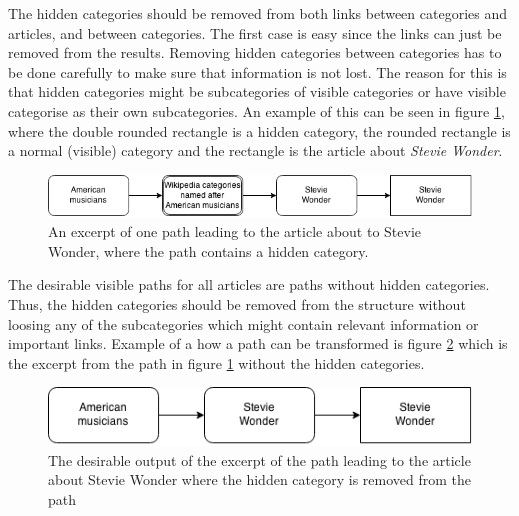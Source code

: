 The hidden categories should be removed from both links between categories and articles, and between categories. The first case is easy since the links can just be removed from the results. Removing hidden categories between categories has to be done carefully to make sure that information is not lost. The reason for this is that hidden categories might be subcategories of visible categories or have visible categorise as their own subcategories. An example of this can be seen in figure \ref{fig:stevie_wonder_hidden}, where the double rounded rectangle is a hidden category, the rounded rectangle is a normal (visible) category and the rectangle is the article about \emph{Stevie Wonder}.




\begin{figure}[h]
\centering
\includegraphics[width=\textwidth]{Chapters/Implementation/HiddenCategories/Stevie_wonder_hidden}
\caption[Example path with hidden category]{An excerpt of one path leading to the article about to Stevie Wonder, where the path contains a hidden category. }
\label{fig:stevie_wonder_hidden}
\end{figure}

The desirable visible paths for all articles are paths without hidden categories. Thus, the hidden categories should be removed from the structure without loosing any of the subcategories which might contain relevant information or  important links. Example of a how a path can be transformed is figure \ref{fig:stevie_wonder} which is the excerpt from the path in figure \ref{fig:stevie_wonder_hidden} without the hidden categories. 

\begin{figure}[h]
\centering
\includegraphics[width=.7\textwidth]{Chapters/Implementation/HiddenCategories/Stevie_wonder}
\caption[Example path without hidden category]{The desirable output of the excerpt of the path leading to the article about Stevie Wonder where the hidden category is removed from the path}
\label{fig:stevie_wonder}
\end{figure}

